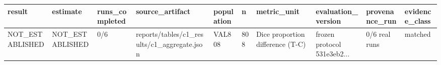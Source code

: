 \begin{tabular}{llllllllll}
\hline
result & estimate & runs\_completed & source\_artifact & population & n & metric\_unit & evaluation\_version & provenance\_run & evidence\_class \\
\hline
NOT\_ESTABLISHED & NOT\_ESTABLISHED & 0/6 & reports/tables/c1\_results/c1\_aggregate.json & VAL808 & 808 & Dice proportion difference (T-C) & frozen protocol 531e3eb2... & 0/6 real runs & matched \\
\hline
\end{tabular}
